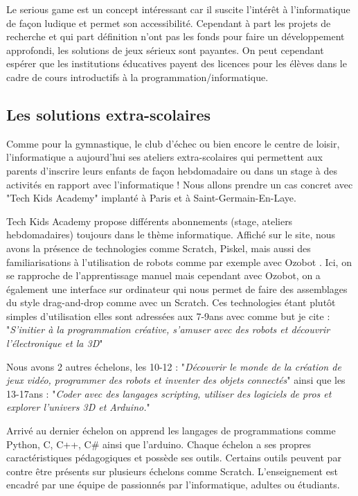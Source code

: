 Le serious game est un concept intéressant car il suscite l'intérêt à l'informatique de façon ludique et permet son accessibilité. Cependant à part les projets de recherche et qui part définition n'ont pas les fonds pour faire un développement approfondi, les solutions de jeux sérieux sont payantes. On peut cependant espérer que les institutions éducatives payent des licences pour les élèves dans le cadre de cours introductifs à la programmation/informatique.

\newpage

\subsection{Les solutions extra-scolaires}

Comme pour la gymnastique, le club d'échec ou bien encore le centre de loisir, l'informatique a aujourd'hui ses ateliers extra-scolaires qui permettent aux parents d'inscrire leurs enfants de façon hebdomadaire ou dans un stage à des activités en rapport avec l'informatique ! Nous allons prendre un cas concret avec "Tech Kids Academy" implanté à Paris et à Saint-Germain-En-Laye. \cite{44}

Tech Kids Academy propose différents abonnements (stage, ateliers hebdomadaires) toujours dans le thème informatique. Affiché sur le site, nous avons la présence de technologies comme Scratch, Piskel, mais aussi des familiarisations à l'utilisation de robots comme par exemple avec Ozobot \cite{45} . Ici, on se rapproche de l'apprentissage manuel mais cependant avec Ozobot, on a également une interface sur ordinateur qui nous permet de faire des assemblages du style drag-and-drop comme avec un Scratch. Ces technologies étant plutôt simples d'utilisation elles sont adressées aux 7-9ans avec comme but je cite : "\textit{S’initier à la programmation créative, s’amuser avec des robots et découvrir l’électronique et la 3D}"

Nous avons 2 autres échelons, les 10-12 : "\textit{Découvrir le monde de la création de jeux vidéo, programmer des robots et inventer des objets connectés}" ainsi que les 13-17ans : "\textit{Coder avec des langages scripting, utiliser des logiciels de pros et explorer l’univers 3D et Arduino.}"

Arrivé au dernier échelon on apprend les langages de programmations comme Python, C, C++, C\# ainsi que l'arduino. Chaque échelon a ses propres caractéristiques pédagogiques et possède ses outils. Certains outils peuvent par contre être présents sur plusieurs échelons comme Scratch. L'enseignement est encadré par une équipe de passionnés par l'informatique, adultes ou étudiants.

